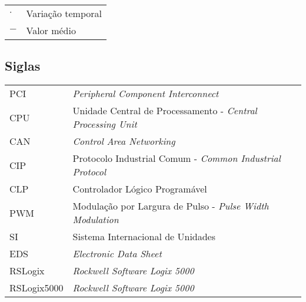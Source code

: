 \begin{tabular}{p{}p{}}
$\cdot$  & Variação temporal \tabularnewline
$-$  & Valor médio \tabularnewline
\end{tabular}


\subsection*{Siglas}

\begin{tabular}{p{}p{}}
PCI  & \textit{Peripheral Component Interconnect}\tabularnewline
CPU & Unidade Central de Processamento - \textit{Central Processing Unit} \tabularnewline
CAN & \textit{Control Area Networking} \tabularnewline
CIP & Protocolo Industrial Comum - \textit{Common Industrial Protocol} \tabularnewline
CLP & Controlador Lógico Programável\tabularnewline
PWM &  Modulação por Largura de Pulso - \textit{Pulse Width Modulation}\tabularnewline
SI & Sistema Internacional de Unidades \tabularnewline
EDS & \textit{Electronic Data Sheet}
\tabularnewline
RSLogix & \textit{Rockwell Software Logix 5000}
\tabularnewline
RSLogix5000 & \textit{Rockwell Software Logix 5000}
\end{tabular}
